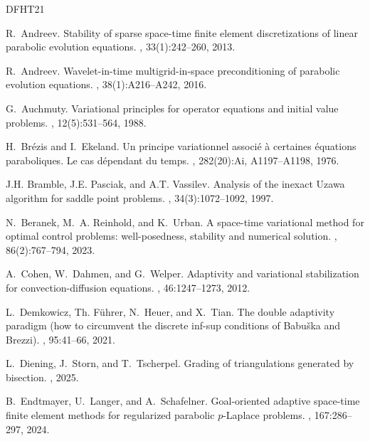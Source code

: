 \documentclass{amsart}
\numberwithin{equation}{section}
\newcommand{\1}{\mathbb 1}
\begin{document}
\begin{thebibliography}{DFHT21}

R.~Andreev.
\newblock Stability of sparse space-time finite element discretizations of
  linear parabolic evolution equations.
, 33(1):242--260, 2013.

R.~Andreev.
\newblock Wavelet-in-time multigrid-in-space preconditioning of parabolic
  evolution equations.
, 38(1):A216--A242, 2016.

G.~Auchmuty.
\newblock Variational principles for operator equations and initial value
  problems.
, 12(5):531--564, 1988.

H.~Br\'{e}zis and I.~Ekeland.
\newblock Un principe variationnel associ\'{e} \`a certaines \'{e}quations
  paraboliques. {L}e cas d\'{e}pendant du temps.
, 282(20):Ai, A1197--A1198,
  1976.

J.H. Bramble, J.E. Pasciak, and A.T. Vassilev.
\newblock Analysis of the inexact {U}zawa algorithm for saddle point problems.
, 34(3):1072--1092, 1997.

N.~Beranek, M.~A. Reinhold, and K.~Urban.
\newblock A space-time variational method for optimal control problems:
  well-posedness, stability and numerical solution.
, 86(2):767--794, 2023.

A.~Cohen, W.~Dahmen, and G.~Welper.
\newblock Adaptivity and variational stabilization for convection-diffusion
  equations.
,
  46:1247--1273, 2012.

L.~Demkowicz, Th. F\"{u}hrer, N.~Heuer, and X.~Tian.
\newblock The double adaptivity paradigm (how to circumvent the discrete
  inf-sup conditions of {B}abu\v{s}ka and {B}rezzi).
, 95:41--66, 2021.

L.~Diening, J.~Storn, and T.~Tscherpel.
\newblock Grading of triangulations generated by bisection.
, 2025.

B.~Endtmayer, U.~Langer, and A.~Schafelner.
\newblock Goal-oriented adaptive space-time finite element methods for
  regularized parabolic {$p$}-{L}aplace problems.
, 167:286--297, 2024.


\end{thebibliography}
\end{document}
